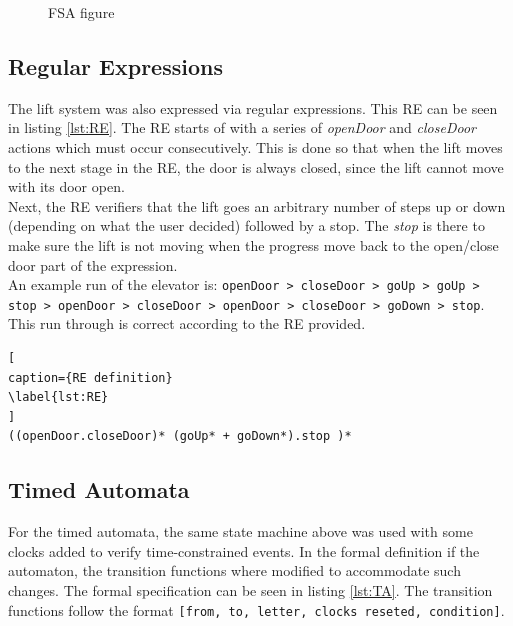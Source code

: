 \documentclass[a4paper, 12pt]{article}
\begin{document}
\begin{figure}[h] %
    \centering %
    \caption{FSA figure}
    \label{fig:FSA}
\end{figure}


\subsection{Regular Expressions}
The lift system was also expressed via regular expressions. This RE can be seen in listing \ref{lst:RE}. The RE starts of with a series of \textit{openDoor} and \textit{closeDoor} actions which must occur consecutively. This is done so that when the lift moves to the next stage in the RE, the door is always closed, since the lift cannot move with its door open. \\

Next, the RE verifiers that the lift goes an arbitrary number of steps up or down (depending on what the user decided) followed by a stop. The \textit{stop} is there to make sure the lift is not moving when the progress move back to the open/close door part of the expression. \\

An example run of the elevator is:
\texttt{openDoor > closeDoor > goUp > goUp > stop > openDoor > closeDoor > openDoor > closeDoor > goDown > stop}.
This run through is correct according to the RE provided. 

\begin{lstlisting}[
caption={RE definition}
\label{lst:RE}
]
((openDoor.closeDoor)* (goUp* + goDown*).stop )*

\end{lstlisting}


\subsection{Timed Automata}
For the timed automata, the same state machine above was used with some clocks added to verify time-constrained events. In the formal definition if the automaton, the transition functions where modified to accommodate such changes. The formal specification can be seen in listing \ref{lst:TA}. The transition functions follow the format \texttt{[from, to, letter, clocks reseted, condition]}. \\
\end{document}
